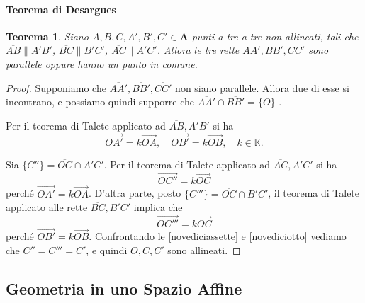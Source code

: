 \documentclass{article}
\theoremstyle{plain}
\newtheorem{thm}{Teorema}[section]
\theoremstyle{definition}
\theoremstyle{remark}
\begin{document}
\vspace{10pt}

\paragraph{Teorema di Desargues}
\begin{bxthm}
\begin{thm}
Siano $A,B,C,A',B',C' \in \mathbf{A}$ punti a tre a tre non allineati, tali che $\overline{AB} \parallel \overline{A'B'}$, $\overline{BC} \parallel \overline{B'C'}$, $\overline{AC} \parallel \overline{A'C'}$. 
Allora le tre rette $\overline{AA'}, \overline{BB'}, \overline{CC'}$ sono parallele oppure hanno un punto in comune.
\end{thm}
\end{bxthm}
\begin{proof}
Supponiamo che $\overline{AA'}, \overline{BB'}, \overline{CC'}$ non siano parallele. Allora due di esse si incontrano, e possiamo quindi supporre che $\overline{AA'} \cap \overline{BB'} = \{O\}$ .

Per il teorema di Talete applicato ad $\overline{AB}, \overline{A'B'}$ si ha
\[\overrightarrow{OA'} = k\overrightarrow{OA}, \quad \overrightarrow{OB'} = k\overrightarrow{OB}, \quad k \in \mathbb{K}.\]

Sia $\{C''\} = \overline{OC} \cap \overline{A'C'}$. Per il teorema di Talete applicato ad $\overline{AC}, \overline{A'C'}$ si ha
\begin{equation}\label{novediciassette}
    \overrightarrow{OC''} = k\overrightarrow{OC}
\end{equation}
perché $\overrightarrow{OA'} = k\overrightarrow{OA}$. D'altra parte, posto $\{C'''\} = \overline{OC} \cap \overline{B'C'}$, il teorema di Talete applicato alle rette $\overline{BC}, \overline{B'C'}$ implica che
\begin{equation}\label{novediciotto}
    \overrightarrow{OC'''} = k\overrightarrow{OC}
\end{equation}
perché $\overrightarrow{OB'} = k\overrightarrow{OB}$. 
Confrontando le \ref{novediciassette} e \ref{novediciotto} vediamo che $C'' = C''' = C'$, e quindi $O, C, C'$ sono allineati.    
\end{proof}

\vspace{50pt}
\subsection{Geometria in uno Spazio Affine}
\vspace{20pt}
\end{document}
